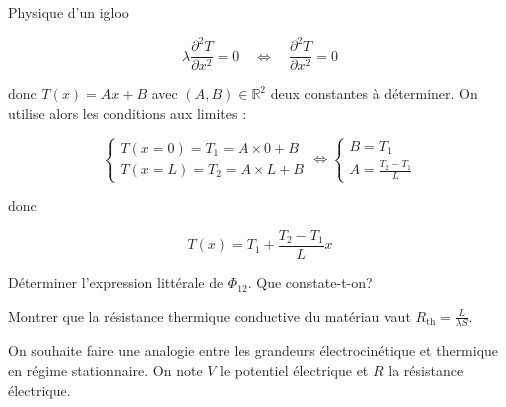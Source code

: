 \begin{exo}[PC][1][devoir]{Physique d'un igloo}
\begin{quest}
{$$
\lambda \frac{\partial^{2} T}{\partial x^{2}}=0 \quad \Leftrightarrow \quad \frac{\partial^{2} T}{\partial x^{2}}=0
$$

donc $T(x)=A x+B$ avec $(A, B) \in \mathbb{R}^{2}$ deux constantes à déterminer. On utilise alors les conditions aux limites :

$$
\left\{\begin{array} { l }
{ T ( x = 0 ) = T _ { 1 } = A \times 0 + B } \\
{ T ( x = L ) = T _ { 2 } = A \times L + B }
\end{array} \Leftrightarrow \left\{\begin{array}{l}
B=T_{1} \\
A=\frac{T_{2}-T_{1}}{L}
\end{array}\right.\right.
$$

donc

$$
T(x)=T_{1}+\frac{T_{2}-T_{1}}{L} x
$$
}

\item Déterminer l'expression littérale de $\Phi_{12}$. Que constate-t-on?

\item Montrer que la résistance thermique conductive du matériau vaut $R_{\mathrm{th}}=\frac{L}{\lambda S}$.


\end{quest}
On souhaite faire une analogie entre les grandeurs électrocinétique et thermique en régime stationnaire. On note $V$ le potentiel électrique et $R$ la résistance électrique.


\end{exo}
